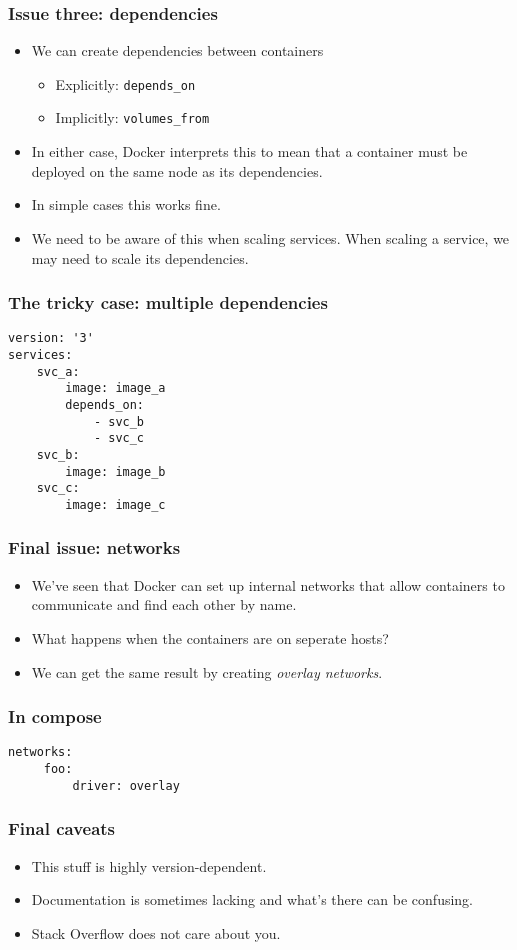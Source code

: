 \documentclass[10pt]{beamer}
\begin{document}
\begin{frame}
  \frametitle{Issue three: dependencies}
   
   \begin{itemize}
     \item We can create dependencies between containers
              \begin{itemize}
                \item Explicitly: \texttt{depends\_on}
                \item Implicitly: \texttt{volumes\_from}
              \end{itemize}
         
     \item In either case, Docker interprets this to mean that a container must be deployed on the same node as its dependencies.
     \item In simple cases this works fine.
     \item We need to be aware of this when scaling services. When scaling a service, we may need to scale its dependencies.
   \end{itemize}
\end{frame}


\begin{frame}[fragile]
    \frametitle{The tricky case: multiple dependencies}
    
    \begin{verbatim}
version: '3'
services:
    svc_a:  
        image: image_a
        depends_on:
            - svc_b
            - svc_c
    svc_b:  
        image: image_b
    svc_c:  
        image: image_c
    \end{verbatim}
\end{frame}

\begin{frame}
  \frametitle{Final issue: networks}
   
   \begin{itemize}
     \item We've seen that Docker can set up internal networks that allow containers to communicate and find each other by name.   
     \item What happens when the containers are on seperate hosts?
     \item We can get the same result by creating \emph{overlay networks}.
   \end{itemize}
\end{frame}

\begin{frame}[fragile]
    \frametitle{In compose}
     \begin{verbatim}
networks:
     foo:
         driver: overlay
     \end{verbatim}
 \end{frame}
 
 \begin{frame}
  \frametitle{Final caveats}
   
   \begin{itemize}
     \item This stuff is highly version-dependent.
     \item Documentation is sometimes lacking and what's there can be confusing.
     \item Stack Overflow does not care about you.
   \end{itemize}
\end{frame}    
 
\end{document}
